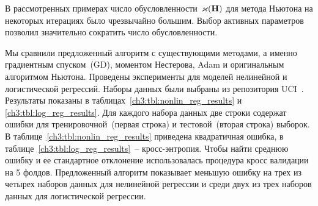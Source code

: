 В рассмотренных примерах число обусловленности~$\varkappa(\mathbf{H})$ для метода Ньютона на некоторых итерациях было чрезвычайно большим. 
Выбор активных параметров позволил значительно сократить число обусловленности. 

Мы сравнили предложенный алгоритм с существующими методами, а именно градиентным спуском~(GD), моментом Нестерова, Adam и оригинальным алгоритмом Ньютона. 
Проведены эксперименты для моделей нелинейной и логистической регрессий. 
Наборы данных были выбраны из репозитория UCI~\cite{uci2017}. 
Результаты показаны в таблицах~\ref{ch3:tbl:nonlin_reg_results} и \ref{ch3:tbl:log_reg_results}. 
Для каждого набора данных две строки содержат ошибки для тренировочной~(первая строка) и тестовой~(вторая строка) выборок. 
В таблице~\ref{ch3:tbl:nonlin_reg_results} приведена квадратичная ошибка, в таблице~\ref{ch3:tbl:log_reg_results}~-- кросс-энтропия.
Чтобы найти среднюю ошибку и ее стандартное отклонение использовалась процедура кросс валидации на 5 фолдов. 
Предложенный алгоритм показывает меньшую ошибку на трех из четырех наборов данных для нелинейной регрессии и среди двух из трех наборов данных для логистической регрессии.

